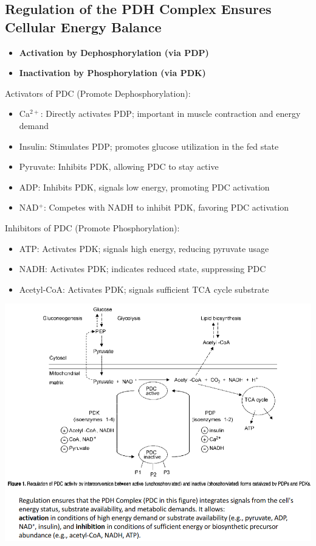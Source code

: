 \documentclass[10pt]{article}
\newcommand{\pc}{$^+$}
\begin{document}
\subsection*{Regulation of the PDH Complex Ensures Cellular Energy Balance}
\begin{itemize}
    \item \textbf{Activation by Dephosphorylation (via PDP)}
    \item \textbf{Inactivation by Phosphorylation (via PDK)}
\end{itemize}
Activators of PDC (Promote Dephosphorylation):
\begin{itemize}
	\item Ca$^{2+}$: Directly activates PDP; important in muscle contraction and energy demand
	\item Insulin: Stimulates PDP; promotes glucose utilization in the fed state
	\item Pyruvate: Inhibits PDK, allowing PDC to stay active
	\item ADP: Inhibits PDK, signals low energy, promoting PDC activation
	\item NAD\pc: Competes with NADH to inhibit PDK, favoring PDC activation
\end{itemize}
Inhibitors of PDC (Promote Phosphorylation):
\begin{itemize}
	\item ATP: Activates PDK; signals high energy, reducing pyruvate usage
	\item NADH: Activates PDK; indicates reduced state, suppressing PDC
	\item Acetyl-CoA: Activates PDK; signals sufficient TCA cycle substrate
\end{itemize}
\begin{center} 
	\includegraphics*[width=\textwidth]{L3_18.png}
\end{center}
\end{document}
